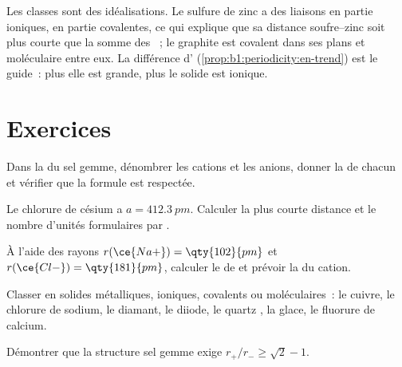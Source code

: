 \begin{remark}[Un continuum]\label{rem:b1:crystals-ionic-covalent:continuum}
Les classes sont des idéalisations. Le sulfure de zinc a des liaisons en
partie ioniques, en partie covalentes, ce qui explique que sa distance
soufre--zinc soit plus courte que la somme des ~; le
graphite est covalent dans ses plans et moléculaire entre eux. La
différence d' (\cref{prop:b1:periodicity:en-trend}) est
le guide~: plus elle est grande, plus le solide est ionique.
\end{remark}

\section{Exercices}

\begin{exercise}[$\star$]\label{exo:b1:crystals-ionic-covalent:1}
Dans la  du sel gemme, dénombrer les cations et les anions, donner
la  de chacun et vérifier que la formule  est
respectée.
\end{exercise}

\begin{exercise}[$\star$]\label{exo:b1:crystals-ionic-covalent:2}
Le chlorure de césium a $a = \qty{412.3}{pm}$. Calculer la plus courte
distance  et le nombre d'unités formulaires par .
\end{exercise}

\begin{exercise}[$\star$]\label{exo:b1:crystals-ionic-covalent:3}
À l'aide des rayons $r(\ce{Na+}) = \qty{102}{pm}$ et $r(\ce{Cl-}) =
\qty{181}{pm}$, calculer le  de  et prévoir la
 du cation.
\end{exercise}

\begin{exercise}[$\star$]\label{exo:b1:crystals-ionic-covalent:4}
Classer en solides métalliques, ioniques, covalents ou moléculaires~: le
cuivre, le chlorure de sodium, le diamant, le diiode, le quartz
, la glace, le fluorure de calcium.
\end{exercise}

\begin{exercise}[$\star\star$]\label{exo:b1:crystals-ionic-covalent:5}
Démontrer que la structure sel gemme exige $r_+/r_- \ge \sqrt2 - 1$.
\end{exercise}

